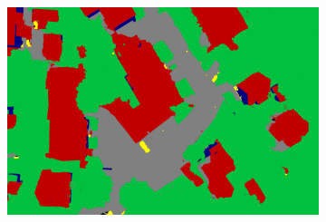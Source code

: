 \begin{figure}[htb]
\begin{subfigure}{0.243\columnwidth}
\end{subfigure}
\begin{subfigure}{0.243\columnwidth}
  \centering
  \includegraphics[width=1\linewidth]{fig/segmentation/DSC00849_6000_autocrf.png}
\end{subfigure}



\end{figure}
